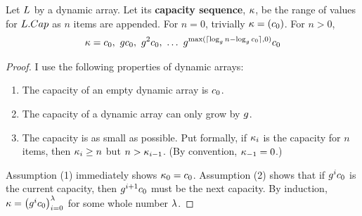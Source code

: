 \begin{lemma}
\label{lem:CapacitySeq}
	Let $L$ by a dynamic array. Let its \textbf{capacity sequence}, $\kappa$, be the range of values for $L.Cap$ as $n$ items are appended. For $n = 0$, trivially $\kappa = (c_0)$. For $n > 0$,
	\begin{align*}
	\VarCapacitySeq = \VarInitCapacity,\ \VarGrowthFactor\VarInitCapacity,\ \VarGrowthFactor^2\VarInitCapacity,\ \ldots\ \VarGrowthFactor^{\max(\lceil \log_{\VarGrowthFactor} n - \log_{\VarGrowthFactor} \VarInitCapacity \rceil, 0)}\VarInitCapacity
	\end{align*}
\end{lemma}

\begin{proof}
	I use the following properties of dynamic arrays:
	\begin{enumerate}
		\item The capacity of an empty dynamic array is $c_0$.
		\item The capacity of a dynamic array can only grow by $g$.
		\item The capacity is as small as possible. Put formally, if $\kappa_i$ is the capacity for $n$ items, then $\kappa_i \geq n$ but $n > \kappa_{i - 1}$. (By convention, $\kappa_{-1} = 0$.)
	\end{enumerate}
	Assumption (1) immediately shows $\kappa_0 = c_0$. Assumption (2) shows that if $g^ic_0$ is the current capacity, then $g^{i + 1}c_0$ must be the next capacity. By induction, $\kappa = \left( g^ic_0 \right)_{i = 0}^\lambda$ for some whole number $\lambda$.
	

\end{proof}
